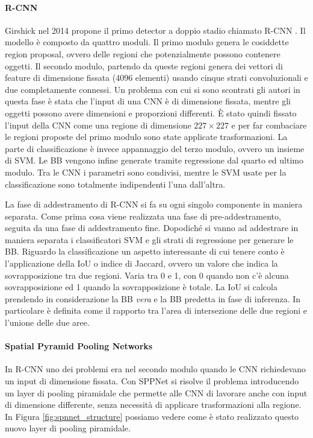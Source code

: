 \paragraph{R-CNN} 
Girshick nel 2014 propone il primo detector a doppio stadio chiamato R-CNN \cite{girshick2014rich}. Il modello è composto da quattro moduli. Il primo modulo genera le cosiddette region proposal, ovvero delle regioni che potenzialmente possono contenere oggetti. Il secondo modulo, partendo da queste regioni genera dei vettori di feature di dimensione fissata (4096 elementi) usando cinque strati convoluzionali e due completamente connessi. Un problema con cui si sono scontrati gli autori in questa fase è stata che l'input di una \ac{CNN} è di dimensione fissata, mentre gli oggetti possono avere dimensioni e proporzioni differenti. È stato quindi fissato l'input della \ac{CNN} come una regione di dimensione $227 \times 227$ e per far combaciare le regioni proposte del primo modulo sono state applicate trasformazioni.
La parte di classificazione è invece appannaggio del terzo modulo, ovvero  un insieme di \ac{SVM}. Le \ac{BB} vengono infine generate tramite regressione dal quarto ed ultimo modulo. Tra le \ac{CNN} i parametri sono condivisi, mentre le \ac{SVM} usate per la classificazione sono totalmente indipendenti l'una dall'altra.

La fase di addestramento di R-CNN si fa su ogni singolo componente in maniera separata. Come prima cosa viene realizzata una fase di pre-addestramento, seguita da una fase di addestramento fine. Dopodiché si vanno ad addestrare in maniera separata i classificatori \ac{SVM} e gli strati di regressione per generare le \ac{BB}.
Riguardo la classificazione un aspetto interessante di cui tenere conto è l'applicazione della \ac{IoU} o indice di Jaccard, ovvero un valore che indica la sovrapposizione tra due regioni. Varia tra 0 e 1, con 0 quando non c'è alcuna sovrapposizione ed 1 quando la sovrapposizione è totale. La \ac{IoU} si calcola prendendo in considerazione la \ac{BB} \textit{vera} e la \ac{BB} predetta in fase di inferenza. In particolare è definita come il rapporto tra l'area di intersezione delle due regioni e l'unione delle due aree. 

\paragraph{Spatial Pyramid Pooling Networks} In R-CNN uno dei problemi era nel secondo modulo quando le \ac{CNN} richiedevano un input di dimensione fissata. Con \ac{SPPNet} \cite{he2015spatial} si risolve il problema introducendo un layer di pooling piramidale che permette alle \ac{CNN} di lavorare anche con input di dimensione differente, senza necessità di applicare trasformazioni alla regione. In Figura \ref{fig:spnnet_structure} possiamo vedere come è stato realizzato questo nuovo layer di pooling piramidale. 


